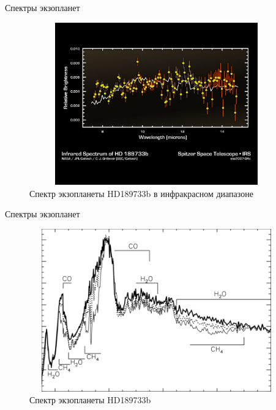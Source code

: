 \documentclass[
]{beamer}
\begin{document}
	\begin{frame}{Спектры экзопланет}
		\begin{figure}[H]
			\centering
			\includegraphics[width=11cm, height=7cm]{Ssc2007-04c.jpg}
			\caption{Спектр экзопланеты HD189733b в инфракрасном диапазоне}
		\end{figure}
	\end{frame}

	\begin{frame}{Спектры экзопланет}
		\begin{figure}[H]
			\centering
			\includegraphics[width=11cm, height=7cm]{last.png}
			\caption{Спектр экзопланеты HD189733b}
		\end{figure}
	\end{frame}
\end{document}
